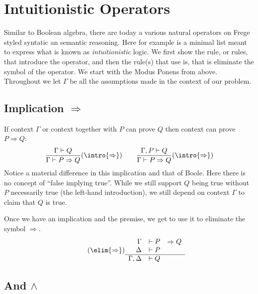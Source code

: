 \section{Intuitionistic Operators}
Similar to Boolean algebra, there are today a various natural operators on Frege styled 
syntatic an semantic reasoning.  Here for example is a minimal list meant to express 
what is known as \emph{intuitionistic} logic.  We first show the rule, or rules, that introduce
the operator, and then the rule(s) that use is, that is eliminate the symbol of the operator.
We start with the Modus Ponens from above.  Throughout we let $\Gamma$ be all the assumptions 
made in the context of our problem.

\subsection{Implication $\Rightarrow$}
If context $\Gamma$ or context together with $P$ can prove $Q$ then context 
can prove $P\Rightarrow Q$:
\begin{align*}
    \frac{\Gamma\vdash Q}{\Gamma\vdash P\Rightarrow Q}(\intro{\Rightarrow})
    \qquad 
    \frac{\Gamma,P\vdash Q}{\Gamma \vdash P\Rightarrow Q}(\intro{\Rightarrow})
\end{align*}
Notice a material difference in this implication and that of Boole.  Here there is 
no concept of ``false implying true''.  While we still support $Q$ being true without 
$P$ necessarily true (the left-hand introduction), we still depend on context $\Gamma$ 
to claim that $Q$ is true.  

Once we have an implication and the premise, we get to use it to eliminate the symbol 
$\Rightarrow$.
\begin{gather}
    \tag{$\elim{\Rightarrow}$}
    \begin{array}{rrl}
       \Gamma &\vdash  P &\Rightarrow Q\\
     \Delta  &\vdash  P\\
    \hline 
      \Gamma,\Delta &\vdash  Q
    \end{array}
\end{gather}

\subsection{And $\wedge$}

